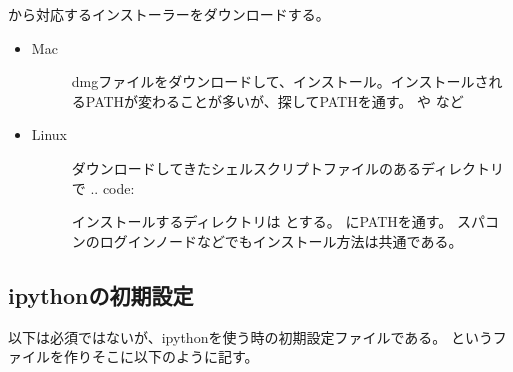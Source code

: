 \documentclass[letterpaper,10pt,dvipdfmx,report]{sphinxmanual}
\begin{document}
 から対応するインストーラーをダウンロードする。
\begin{itemize}
\item {} \begin{description}
\item[{Mac}] \leavevmode
dmgファイルをダウンロードして、インストール。インストールされるPATHが変わることが多いが、探してPATHを通す。  や  など

\end{description}

\item {} \begin{description}
\item[{Linux}] \leavevmode
ダウンロードしてきたシェルスクリプトファイルのあるディレクトリで
.. code:

\begin{sphinxVerbatim}[commandchars=\\\{\}]
 
\end{sphinxVerbatim}

インストールするディレクトリは  とする。
 にPATHを通す。
スパコンのログインノードなどでもインストール方法は共通である。

\end{description}

\end{itemize}


\subsection{ipythonの初期設定}
\label{\detokenize{environment:ipython}}
以下は必須ではないが、ipythonを使う時の初期設定ファイルである。
というファイルを作りそこに以下のように記す。
\end{document}

